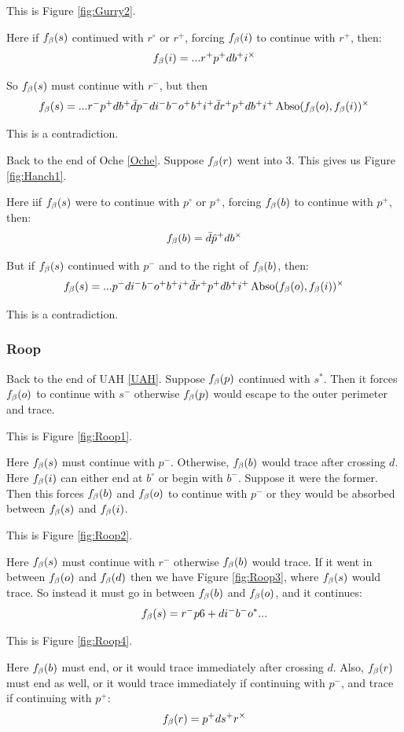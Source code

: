 This is Figure \ref{fig:Gurry2}.

Here if $f_\beta(s)$ continued with $r^\circ$ or $r^+$, forcing $f_\beta(i)$ to continue with $r^+$, then:
\[
f_\beta(i) = ...r^+ p^+ d b^+ i^\times
\]

So $f_\beta(s)$ must continue with $r^-$, but then
\[
f_\beta(s) = ...r^- p^+ d b^+ \bar{d} p^- d i^- b^- o^+ b^+ i^+ \bar{d} r^+ p^+ d b^+ i^+ \operatorname{Abso}(f_\beta(o), f_\beta(i))^\times
\]

This is a contradiction.

\label{Hanch}
Back to the end of Oche \ref{Oche}. Suppose $f_\beta(r)$ went into 3. This gives us Figure \ref{fig:Hanch1}.

Here iif $f_\beta(s)$ were to continue with $p^\circ$ or $p^+$, forcing $f_\beta(b)$ to continue with $p^+$, then:
\[
f_\beta(b) = \bar{d} \hat{p}^+ d b^\times
\]

But if $f_\beta(s)$ continued with $p^-$ and to the right of $f_\beta(b)$, then:
\[
f_\beta(s) = ...p^- d i^- b^- o^+ b^+ i^+ \bar{d} r^+ p^+ d b^+ i^+ \operatorname{Abso}(f_\beta(o), f_\beta(i))^\times
\]

This is a contradiction.

\subsubsection{Roop}\label{Roop}
Back to the end of UAH \ref{UAH}. Suppose $f_\beta(p)$ continued with $s^*$. Then it forces $f_\beta(o)$ to continue with $s^-$ otherwise $f_\beta(p)$ would escape to the outer perimeter and trace.

This is Figure \ref{fig:Roop1}.

Here $f_\beta(s)$ must continue with $p^-$. Otherwise, $f_\beta(b)$ would trace after crossing $d$. Here $f_\beta(i)$ can either end at $b^\circ$ or begin with $b^-$. Suppose it were the former. Then this forces $f_\beta(b)$ and $f_\beta(o)$ to continue with $p^-$ or they would be absorbed between $f_\beta(s)$ and $f_\beta(i)$.

This is Figure \ref{fig:Roop2}.

Here $f_\beta(s)$ must continue with $r^-$ otherwise $f_\beta(b)$ would trace. If it went in between $f_\beta(o)$ and $f_\beta(d)$ then we have Figure \ref{fig:Roop3}, where $f_\beta(s)$ would trace. So instead it must go in between $f_\beta(b)$ and $f_\beta(o)$, and it continues:
\[
f_\beta(s) = r^- p6+ d i^- b^- o^*...
\]

This is Figure \ref{fig:Roop4}.

Here $f_\beta(b)$ must end, or it would trace immediately after crossing $d$. Also, $f_\beta(r)$ must end as well, or it would trace immediately if continuing with $p^-$, and trace if continuing with $p^+$:
\[
f_\beta(r) = p^+ d s^+ r^\times
\]

